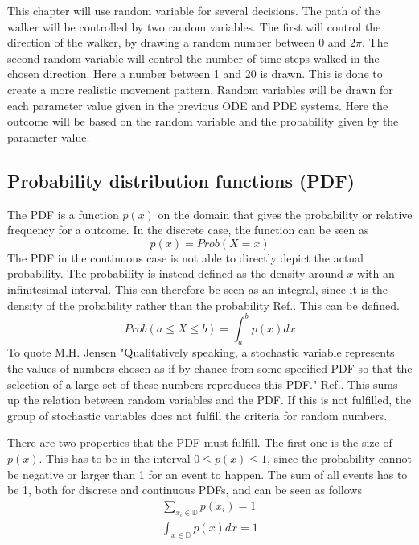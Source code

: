 \documentclass[%
twoside,                 %
final,                   %
chapterprefix=true,      %
open=right               %
10pt]{book}
\begin{document}
\vspace{3mm}




\vspace{3mm}


This chapter will use random variable for several decisions. The path of the walker will be controlled by two random variables. The first will control the direction of the walker, by drawing a random number between $0$ and $2\pi$. The second random variable will control the number of time steps walked in the chosen direction. Here a number between 1 and 20 is drawn. This is done to create a more realistic movement pattern. Random variables will be drawn for each parameter value given in the previous ODE and PDE systems. Here the outcome will be based on the random variable and the probability given by the parameter value. 

\subsection{Probability distribution functions (PDF)}
The PDF is a function $p(x)$ on the domain that gives the probability or relative frequency for a outcome. In the discrete case, the function can be seen as
\begin{equation}
p(x) = Prob(X=x)
\end{equation}
The PDF in the continuous case is not able to directly depict the actual probability. The probability is instead defined as the density around $x$ with an infinitesimal interval. This can therefore be seen as an integral, since it is the density of the probability rather than the probability Ref.\cite{hjorth2011computational}. This can be defined.
\begin{equation}
 Prob(a\leq X \leq b) = \int^b_a p(x)dx
\end{equation}
To quote M.H. Jensen "Qualitatively speaking, a stochastic variable represents the values of numbers chosen as if by chance from some specified PDF so that the selection of a large set of these numbers reproduces this PDF." Ref.\cite{hjorth2011computational}. This sums up the relation between random variables and the PDF. If this is not fulfilled, the group of stochastic variables does not fulfill the criteria for random numbers. 

There are two properties that the PDF must fulfill. The first one is the size of $p(x)$. This has to be in the interval $0\leq p(x) \leq 1$, since the probability cannot be negative or larger than 1 for an event to happen. The sum of all events has to be 1, both for discrete and continuous PDFs, and can be seen as follows
\begin{equation}
	\begin{aligned}
    \sum_{x_i \in \mathbb{D}} p(x_i) = 1\\
    \int_{x \in \mathbb{D}} p(x) dx = 1
	\end{aligned}
\end{equation} 
\end{document}
